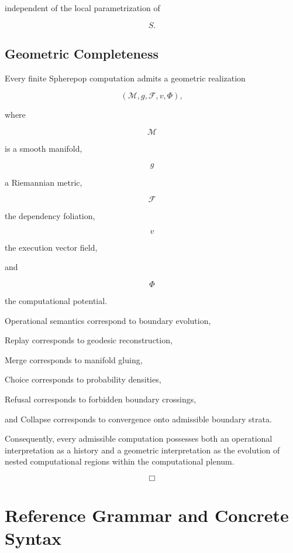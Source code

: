 \documentclass[12pt,oneside]{article}
\theoremstyle{definition}
\theoremstyle{remark}
\begin{document}
independent of the local parametrization of

\[
S.
\]

\subsection*{Geometric Completeness}

Every finite Spherepop computation admits a geometric realization

\[
(\mathcal M,
g,
\mathcal F,
v,
\Phi),
\]

where

\[
\mathcal M
\]

is a smooth manifold,

\[
g
\]

a Riemannian metric,

\[
\mathcal F
\]

the dependency foliation,

\[
v
\]

the execution vector field,

and

\[
\Phi
\]

the computational potential.

Operational semantics correspond to boundary evolution,

Replay corresponds to geodesic reconstruction,

Merge corresponds to manifold gluing,

Choice corresponds to probability densities,

Refusal corresponds to forbidden boundary crossings,

and Collapse corresponds to convergence onto admissible boundary strata.

Consequently, every admissible computation possesses both an operational
interpretation as a history and a geometric interpretation as the evolution
of nested computational regions within the computational plenum.

\[
\Box
\]

\section{Reference Grammar and Concrete Syntax}
\end{document}
